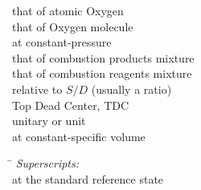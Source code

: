 \begin{tabbing}
            \> that of atomic Oxygen                                                                                                                    \\
           \> that of Oxygen molecule                                                                                                                  \\
                                      \> at constant-pressure                                                                                                                     \\
             \> that of combustion products mixture                                                                                                      \\
             \> that of combustion reagents mixture                                                                                                      \\
                                   \> relative to $S/D$ (usually a ratio)                                                                                                      \\
    \tcs{{}_{\tdc}}                             \> Top Dead Center, TDC                                                                                                                     \\
                                      \> unitary or unit                                                                                                                          \\
                                      \> at constant-specific volume                                                                                                              \\
\end{tabbing}
                                                                                                                      
\begin{tabbing}\hspace*{\lensymb}\=\hspace*{\lenWHAT}\kill
    {\em Superscripts:} \\                                                                       
                                      \> at the standard reference state                                                                                          \\
\end{tabbing}

